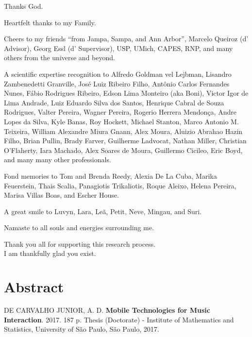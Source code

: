 \documentclass[11pt,twoside,a4paper]{book}
\begin{document}
	\begin{flushleft}
	
	Thanks God.
	\linebreak
	
	Heartfelt thanks to my Family.
	\linebreak
	
    Cheers to my friends ``from Jampa, Sampa, and Ann Arbor'', Marcelo Queiroz (d' Advisor), Georg Essl (d' Supervisor), USP, UMich, CAPES, RNP, and many others from the universe and beyond.
	\linebreak	
	
	A scientific expertise recognition to Alfredo Goldman vel Lejbman, Lisandro Zambenedetti Granville, José Luiz Ribeiro Filho, Antônio Carlos Fernandes Nunes, Fábio Rodrigues Ribeiro, Edson Lima Monteiro (aka Boni), Victor Igor de Lima Andrade, Luiz Eduardo Silva dos Santos, Henrique Cabral de Souza Rodrigues, Valter Pereira, Wagner Pereira, Rogerio Herrera Mendonça, Andre Lopes da Silva, Kyle Banas, Roy Hockett, Michael Stanton, Marco Antonio M. Teixeira, William Alexandre Miura Gnann, Alex Moura, Aluizio Abrahao Hazin Filho, Brian Pullin, Brady Farver, Guilherme Ladvocat, Nathan Miller, Christian O'Flaherty, Iara Machado, Alex Soares de Moura, Guillermo Cicileo, Eric Boyd, and many many other professionals.
	\linebreak
	
	Fond memories to Tom and Brenda Reedy, Alexia De La Cuba, Marika Feuerstein, Thais Scalia, Panagiotis Trikaliotis, Roque Aleixo, Helena Pereira, Marisa Villas Boas, and Escher House.
	\linebreak
	
	A great smile to Luvyn, Lara, Leã, Petit, Neve, Mingau, and Suri.
	\linebreak
	
	Namaste to all souls and energies surrounding me.
	\linebreak
	
	\centering
	Thank you all for supporting this research process. \\
	I am thankfully glad you exist.

	\end{flushleft}

	
	\chapter*{Abstract}
	\noindent DE CARVALHO JUNIOR, A. D. \textbf{Mobile Technologies for Music Interaction}. 
	2017. 187 p.
	Thesis (Doctorate) -  Institute of Mathematics and Statistics, University of São Paulo, São Paulo, 2017.
	\\
	
\end{document}
